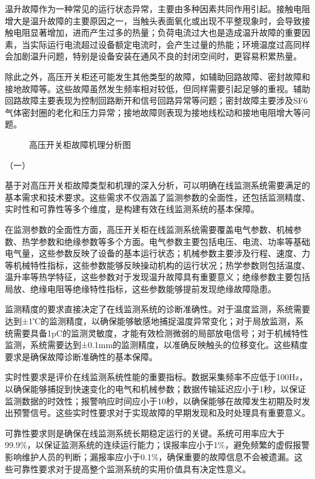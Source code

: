温升故障作为一种常见的运行状态异常，主要由多种因素共同作用引起。接触电阻增大是温升故障的主要原因之一，当触头表面氧化或出现不平整现象时，会导致接触电阻显著增加，进而产生过多的热量；负荷电流过大也是造成温升故障的重要因素，当实际运行电流超过设备额定电流时，会产生过量的热能；环境温度过高同样会加剧温升问题，特别是设备安装在通风不良的封闭空间时，更容易积累热量。

除此之外，高压开关柜还可能发生其他类型的故障，如辅助回路故障、密封故障和接地故障等。这些故障虽然发生频率相对较低，但同样需要引起足够的重视。辅助回路故障主要表现为控制回路断开和信号回路异常等问题；密封故障主要涉及SF6气体密封圈的老化和压力异常；接地故障则表现为接地线松动和接地电阻增大等问题。

\begin{figure}[h]
\centering
\caption{高压开关柜故障机理分析图}
\label{fig:fault_mechanism}
\end{figure}

（一）

基于对高压开关柜故障类型和机理的深入分析，可以明确在线监测系统需要满足的基本需求和技术要求。这些需求不仅涵盖了监测参数的全面性，还包括监测精度、实时性和可靠性等多个维度，是构建有效在线监测系统的基本保障。

在监测参数的全面性方面，高压开关柜在线监测系统需要覆盖电气参数、机械参数、热学参数和绝缘参数等多个方面。电气参数主要包括电压、电流、功率等基础电气量，这些参数反映了设备的基本运行状态；机械参数主要涉及行程、速度、力等机械特性指标，这些参数能够反映操动机构的运行状况；热学参数则包括温度、温升率等热学特征，这些参数对于发现温升故障具有重要意义；绝缘参数主要包括局放、绝缘电阻等绝缘特性指标，这些参数能够提前发现绝缘故障隐患。

监测精度的要求直接决定了在线监测系统的诊断准确性。对于温度监测，系统需要达到±1℃的监测精度，以确保能够敏感地捕捉温度异常变化；对于局放监测，系统需要具备1pC的监测灵敏度，才能有效检测微弱的局部放电信号；对于机械特性监测，系统需要达到±0.1mm的监测精度，以准确反映触头的位移变化。这些精度要求是确保故障诊断准确性的基本保障。

实时性要求是评价在线监测系统性能的重要指标。数据采集频率不应低于100Hz，以确保能够捕捉到快速变化的电气和机械参数；数据传输延迟应小于1秒，以保证监测数据的时效性；报警响应时间应小于10秒，以确保能够在故障发生初期及时发出预警信号。这些实时性要求对于实现故障的早期发现和及时处理具有重要意义。

可靠性要求则是确保在线监测系统长期稳定运行的关键。系统可用率应大于99.9\%，以保证监测系统的连续运行能力；误报率应小于1\%，避免频繁的虚假报警影响维护人员的判断；漏报率应小于0.1\%，确保重要的故障信息不会被遗漏。这些可靠性要求对于提高整个监测系统的实用价值具有决定性意义。

